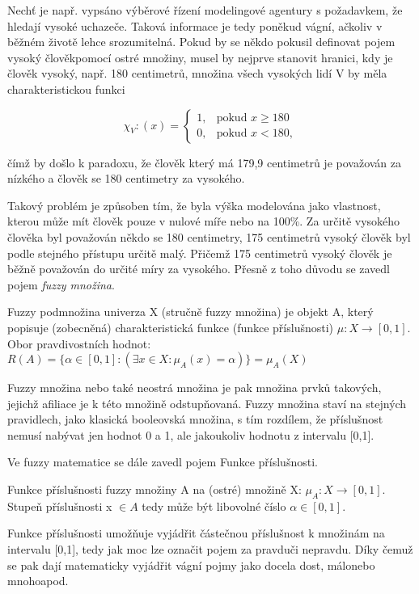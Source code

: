 Nech\v t je např. vypsáno výběrové řízení modelingové agentury s požadavkem, že hledají vysoké uchazeče. Taková informace je tedy poněkud vágní, ačkoliv v běžném životě lehce srozumitelná. Pokud by se někdo pokusil definovat pojem \clqq vysoký člověk\crqq \space pomocí ostré množiny, musel by nejprve stanovit hranici, kdy je člověk vysoký, např. 180 centimetr\r u, množina všech vysokých lidí V by měla charakteristickou funkci

    $$\chi_V:(x)=\begin{cases} 1, & \mbox{pokud }  x \geq 180\\    0, & \mbox{pokud } x < 180,  \end{cases}$$

    čímž by došlo k paradoxu, že člověk který má 179,9 centimetr\r u je považován za nízkého a člověk se 180 centimetry za vysokého.

    Takový problém je zp\r usoben tím, že byla výška modelována jako vlastnost, kterou m\r uže mít člověk pouze v nulové míře nebo na 100\%. Za určitě vysokého člověka byl považován někdo se 180 centimetry, 175 centimetr\r u vysoký člověk byl podle stejného přístupu určitě malý. Přičemž 175 centimetr\r u vysoký člověk je běžně považován do určité míry za vysokého. Přesně z toho d\r uvodu se zavedl pojem \textit{fuzzy množina}. 
    \begin{definition}
    \cite{navara}
        Fuzzy podmnožina univerza X (stručně fuzzy množina) je objekt A, který popisuje (zobecněná) charakteristická funkce (funkce příslušnosti) $\mu: X \rightarrow [0,1]$. Obor pravdivostních hodnot: $R(A) = \{\alpha \in [0,1]: (\exists x \in X : \mu_A(x) = \alpha)\} = \mu_A(X)$
    \end{definition}
    Fuzzy množina nebo také neostrá množina je pak množina prvků takových, jejichž afiliace je k této množině odstupňovaná. Fuzzy množina staví na stejných pravidlech, jako klasická booleovská množina, s tím rozdílem, že příslušnost nemusí nabývat jen hodnot 0 a 1, ale jakoukoliv hodnotu z intervalu [0,1].
    
    Ve fuzzy matematice se dále zavedl pojem Funkce příslušnosti.
    \begin{definition}
        \cite{Kolo} Funkce příslušnosti fuzzy množiny A na (ostré) množině X: $\mu_A : X \rightarrow  [0,1].$ Stupe\v n příslušnosti x $\in A$ tedy m\r uže být libovolné číslo $\alpha \in [0,1]$.
    \end{definition}
    Funkce příslušnosti umož\v nuje vyjádřit částečnou příslušnost k množinám na intervalu [0,1], tedy jak moc lze označit pojem za \clqq pravdu\crqq \space či \clqq nepravdu\crqq. Díky čemuž se pak dají matematicky vyjádřit vágní pojmy jako \clqq docela dost\crqq, \clqq málo\crqq \space nebo \clqq mnoho\crqq \space apod.

